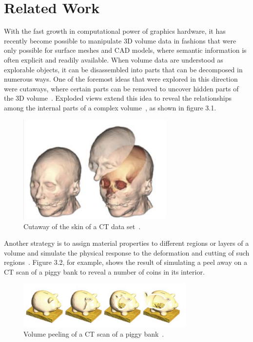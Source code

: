 \section{Related Work}

With the fast growth in computational power of graphics hardware, it has recently become possible to manipulate 3D volume data in fashions that were only possible for surface meshes and CAD models, where semantic information is often explicit and readily available. When volume data are understood as explorable objects, it can be disassembled into parts that can be decomposed in numerous ways. One of the foremost ideas that were explored in this direction were cutaways, where certain parts can be removed to uncover hidden parts of the 3D volume~\cite{c}. Exploded views extend this idea to reveal the relationships among the internal parts of a complex volume~\cite{b}, as shown in figure 3.1.

\begin{figure}[!h]
\centering
\includegraphics[width=220pt]{Images/cut-away.png}
\caption{\label{fig:ray_cast1.jpg} Cutaway of the skin of a CT data set~\cite{b}.}
\end{figure}

Another strategy is to assign material properties to different regions or layers of a volume and simulate the physical response to the deformation and cutting of such regions~\cite{d}. Figure 3.2, for example, shows the result of simulating a peel away on a CT scan of a piggy bank to reveal a number of coins in its interior.

\begin{figure}[!h]
\centering
\includegraphics[width=250pt]{Images/vol-peeling.png}
\caption{\label{fig:ray_cast1.jpg} Volume peeling of a CT scan of a piggy bank~\cite{peel}.}
\end{figure}

